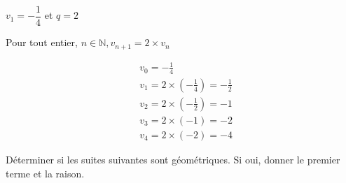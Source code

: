 \documentclass[11pt,a4paper]{article}  %
\begin{document}
\begin{enumMet}
\begin{corrBox}
	\end{corrBox}
	\item $v_1=-\dfrac{1}{4}$ et $q=2$
	\begin{corrBox}
		Pour tout entier, $n \in \mathbb{N}, v_{n+1}=2 \times v_n$
		
		$$
		\begin{aligned}
			& v_0=-\frac{1}{4} \\
			& v_1=2 \times\left(-\frac{1}{4}\right)=-\frac{1}{2} \\
			& v_2=2 \times\left(-\frac{1}{2}\right)=-1 \\
			& v_3=2 \times(-1)=-2 \\
			& v_4=2 \times(-2)=-4
		\end{aligned}
		$$
				
	\end{corrBox}
\end{enumMet}


Déterminer si les suites suivantes sont géométriques. Si oui, donner le premier terme et la raison.
\end{document}
